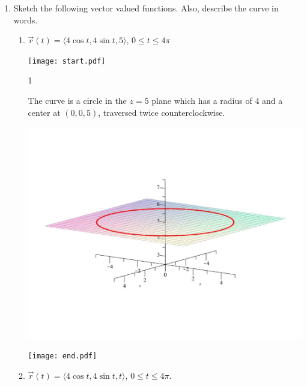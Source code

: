 \documentclass[12pt]{article}
\begin{document}
\begin{enumerate}
\begin{enumerate}
\end{enumerate}

\item Sketch the following vector valued functions.  Also, describe the curve in words.

\begin{enumerate}

\item $\overrightarrow{r}(t)=\langle 4\cos{t}, 4\sin{t}, 5 \rangle$, $0 \leq t \leq 4\pi$

\texttt{[image: start.pdf]}
{{{1\linewidth}{The curve is a circle in the $z=5$ plane which has a radius of 4 and a center at $(0,0,5)$, traversed twice counterclockwise.
\begin{center}
\includegraphics[scale=0.25]{curve1.pdf}
\end{center}}}}
\texttt{[image: end.pdf]}


\item $\overrightarrow{r}(t)=\langle 4\cos{t}, 4\sin{t}, t \rangle$, $0 \leq t \leq 4\pi$.


\end{enumerate}
\end{enumerate}
\end{document}
